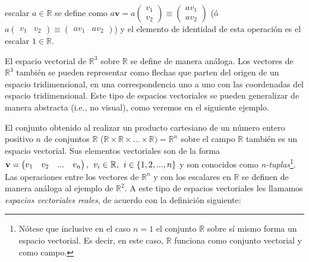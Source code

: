 \documentclass[12pt,dvipsnames]{article}
\begin{document}
escalar $a\in\mathbb{R}$ se define como $a\textbf{v}=a\begin{pmatrix}v_1\\v_2\end{pmatrix} \equiv \begin{pmatrix}av_1\\av_2\end{pmatrix}$ (ó $a\begin{pmatrix}v_1&v_2\end{pmatrix} \equiv \begin{pmatrix}av_1&av_2\end{pmatrix}$) y el elemento de identidad de esta operación es el escalar $1\in\mathbb{R}$.

\vspace{3mm}

El espacio vectorial de $\mathbb{R}^3$ sobre $\mathbb{R}$ se define de manera análoga. Los vectores de $\mathbb{R}^3$ también se pueden representar como flechas que parten del origen de un espacio tridimensional, en una correspondencia uno a uno con las coordenadas del espacio tridimensional. Este tipo de espacios vectoriales se pueden generalizar de manera abstracta (i.e., no visual), como veremos en el siguiente ejemplo.

\vspace{3mm}

El conjunto obtenido al realizar un producto cartesiano de un número entero positivo $n$ de conjuntos $\mathbb{R}$ ($\mathbb{R}\times\mathbb{R}\times...\times\mathbb{R}) = \mathbb{R}^n$ sobre el campo $\mathbb{R}$ también es un espacio vectorial. Sus elementos vectoriales son de la forma $\mathbf{v} = \begin{pmatrix}v_1&v_2& ... & v_n\end{pmatrix}, \hspace{1.5mm} v_i \in \mathbb{R}, \hspace{1.5mm} i \in \{1,2,...,n\}$ y son conocidos como \textit{n-tuplas}\footnote{Nótese que inclusive en el caso $n=1$ el conjunto $\mathbb{R}$ sobre sí mismo forma un espacio vectorial. Es decir, en este caso, $\mathbb{R}$ funciona como conjunto vectorial y como campo.}. Las operaciones entre los vectores de $\mathbb{R}^n$ y con los escalares en $\mathbb{R}$ se definen de manera análoga al ejemplo de $\mathbb{R}^2$. A este tipo de espacios vectoriales les llamamos \textit{espacios vectoriales reales}, de acuerdo con la definición siguiente:

\vspace{1.5mm} 
\end{document}

